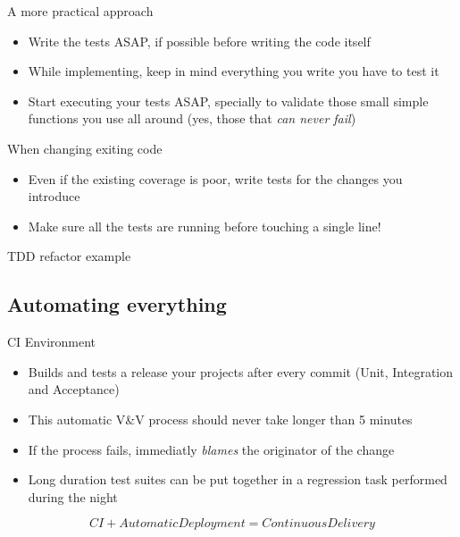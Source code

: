 \documentclass[pdf]{beamer}
\begin{document}
\begin{frame}{A more practical approach}
    \begin{itemize}
    \item Write the tests ASAP, if possible before writing the code itself
    \pause
    \item While implementing, keep in mind everything you write you have to test it
    \pause
    \item Start executing your tests ASAP, specially to validate those small simple functions you use all around (yes,
    those that \emph{can never fail})
    \end{itemize}
    \pause
    When changing exiting code
    \begin{itemize}
    \item Even if the existing coverage is poor, write tests for the changes you introduce
    \pause
    \item Make sure all the tests are running before touching a single line!
    \end{itemize}
\end{frame}

\begin{frame}{TDD refactor example}
\end{frame}

\subsection*{Automating everything}
\label{automating_everything}

\begin{frame}{CI Environment}
    \begin{itemize}
    \item Builds and tests a release your projects after every commit (Unit, Integration and Acceptance)
    \pause
    \item This automatic V\&V process should never take longer than 5 minutes
    \pause
    \item If the process fails, immediatly \emph{blames} the originator of the change
    \pause
    \item Long duration test suites can be put together in a regression task performed during the night
    \end{itemize}
    \pause
    \begin{equation*}
    \boxed{CI + AutomaticDeployment = ContinuousDelivery}
    \end{equation*}
\end{frame}
\end{document}
